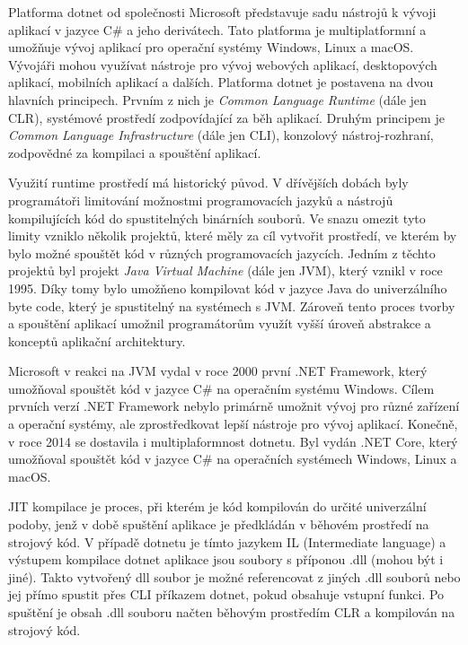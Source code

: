 
Platforma dotnet od společnosti Microsoft představuje sadu nástrojů k vývoji aplikací v jazyce C\# a jeho derivátech. Tato platforma je multiplatformní a umožňuje vývoj aplikací pro operační systémy Windows, Linux a macOS. Vývojáři mohou využívat nástroje pro vývoj webových aplikací, desktopových aplikací, mobilních aplikací a dalších. Platforma dotnet je postavena na dvou hlavních principech. Prvním z nich je \textit{Common Language Runtime} (dále jen CLR), systémové prostředí zodpovídající za běh aplikací. Druhým principem je \textit{Common Language Infrastructure} (dále jen CLI), konzolový nástroj-rozhraní, zodpovědné za kompilaci a spouštění aplikací. \cite{dotnet}

Využití runtime prostředí má historický původ. V dřívějších dobách byly programátoři limitování možnostmi programovacích jazyků a nástrojů kompilujících kód do spustitelných binárních souborů. Ve snazu omezit tyto limity vzniklo několik projektů, které měly za cíl vytvořit prostředí, ve kterém by bylo možné spouštět kód v různých programovacích jazycích. Jedním z těchto projektů byl projekt \textit{Java Virtual Machine} (dále jen JVM), který vznikl v roce 1995. Díky tomy bylo umožňeno kompilovat kód v jazyce Java do univerzálního byte code, který je spustitelný na systémech s JVM. Zároveň tento proces tvorby a spouštění aplikací umožnil programátorům využít vyšší úroveň abstrakce a konceptů aplikační architektury.

Microsoft v reakci na JVM vydal v roce 2000 první .NET Framework, který umožňoval spouštět kód v jazyce C\# na operačním systému Windows. Cílem prvních verzí .NET Framework nebylo primárně umožnit vývoj pro různé zařízení a operační systémy, ale zprostředkovat lepší nástroje pro vývoj aplikací. Konečně, v roce 2014 se dostavila i multiplaformnost dotnetu. Byl vydán .NET Core, který umožňoval spouštět kód v jazyce C\# na operačních systémech Windows, Linux a macOS. \cite{dotnet}

JIT kompilace je proces, při kterém je kód kompilován do určité univerzální podoby, jenž v době spuštění aplikace je předkládán v běhovém prostředí na strojový kód. V případě dotnetu je tímto jazykem IL (Intermediate language) a výstupem kompilace dotnet aplikace jsou soubory s příponou .dll (mohou být i jiné). Takto vytvořený dll soubor je možné referencovat z jiných .dll souborů nebo jej přímo spustit přes CLI příkazem dotnet, pokud obsahuje vstupní funkci. Po spuštění je obsah .dll souboru načten běhovým prostředím CLR a kompilován na strojový kód.\cite{jit}

